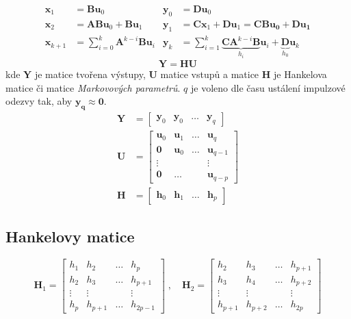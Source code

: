\documentclass{article}
\begin{document}
	\begin{align}
		\bm{x}_1 &= \bm{B} \bm{u}_0 & \bm{y}_0 &= \bm{D}\bm{u}_0 \\
		\bm{x}_2 &= \bm{A}\bm{B} \bm{u}_0 + \bm{B} \bm{u}_1 & \bm{y}_1 &= \bm{C}\bm{x}_1 + \bm{D} \bm{u}_1 = \bm{CBu_0 + Du_1}\\
		\bm{x}_{k+1} &= \sum_{i=0}^{k} \bm{A}^{k-i} \bm{B} \bm{u}_i & \bm{y}_{k} &= \sum_{i=1}^k \underbrace{\bm{C} \bm{A}^{k-i} \bm{B}}_{h_i} \bm{u}_i + \underbrace{\bm{D}}_{h_0} \bm{u}_k 
	\end{align}
	\begin{equation}
		\bm{Y} = \bm{HU}
	\end{equation}
	kde $\bm{Y}$ je matice tvořena výstupy, $\bm{U}$ matice vstupů a matice $\bm{H}$ je Hankelova matice či matice \emph{Markovových parametrů}. $q$ je voleno dle času ustálení impulzové odezvy tak, aby $\bm{y_q}\approx \bm{0}$.
	\begin{align}
		\bm{Y}
		&=
		\begin{bmatrix}
			\bm{y}_0 & \bm{y}_0 & \dots & \bm{y}_q
		\end{bmatrix}
		\\
		\bm{U}
		&=
		\begin{bmatrix}
			\bm{u}_0 & \bm{u}_1 & \dots & \bm{u}_q \\
			\bm{0} & \bm{u}_0 & \dots & \bm{u}_{q-1} \\
			\vdots & & & \vdots \\
			\bm{0} & \dots & & \bm{u}_{q-p} 
		\end{bmatrix}
		\\
		\bm{H}
		&=
		\begin{bmatrix}
			\bm{h}_0 & \bm{h}_1 & \dots & \bm{h}_p
		\end{bmatrix}
	\end{align}

	\subsection{Hankelovy matice}
	\begin{equation}
		\bm{H}_1
		=
		\begin{bmatrix}
			h_1 & h_2 & \dots & h_p \\
			h_2 & h_3 & \dots & h_{p+1} \\
			\vdots & \vdots & & \vdots \\
			h_p & h_{p+1} & \dots & h_{2p-1}
		\end{bmatrix}
		\;,\quad 
		\bm{H}_2
		=
		\begin{bmatrix}
			h_2 & h_3 & \dots & h_{p+1} \\
			h_3 & h_4 & \dots & h_{p+2} \\
			\vdots & \vdots & & \vdots \\
			h_{p+1} & h_{p+2} & \dots & h_{2p}
		\end{bmatrix}
	\end{equation}
\end{document}
